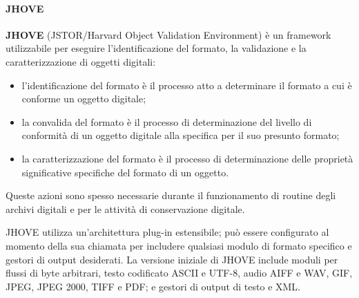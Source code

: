 \paragraph{JHOVE}
\textbf{JHOVE} (JSTOR/Harvard Object Validation Environment) è un framework utilizzabile per eseguire l'identificazione del formato, la validazione e la caratterizzazione di oggetti digitali:

\begin{itemize}
\item l'identificazione del formato è il processo atto a determinare il formato a cui è conforme un oggetto digitale;
\item la convalida del formato è il processo di determinazione del livello di conformità di un oggetto digitale alla specifica per il suo presunto formato;
\item la caratterizzazione del formato è il processo di determinazione delle proprietà significative specifiche del formato di un oggetto.
\end{itemize}

Queste azioni sono spesso necessarie durante il funzionamento di routine degli archivi digitali e per le attività di conservazione digitale.

JHOVE utilizza un'architettura plug-in estensibile; può essere configurato al momento della sua chiamata per includere qualsiasi modulo di formato specifico e gestori di output desiderati. La versione iniziale di JHOVE include moduli per flussi di byte arbitrari, testo codificato ASCII e UTF-8, audio AIFF e WAV, GIF, JPEG, JPEG 2000, TIFF e PDF; e gestori di output di testo e XML.


